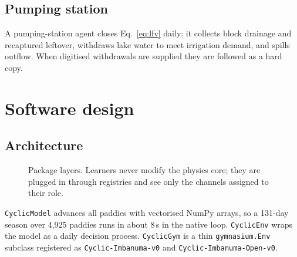 \documentclass[preprint,12pt,authoryear,review]{elsarticle}
\begin{document}
\subsection{Pumping station}

A pumping-station agent closes Eq.~\eqref{eq:lfv} daily: it collects block drainage and recaptured leftover, withdraws lake water to meet irrigation demand, and spills outflow. When digitised withdrawals are supplied they are followed as a hard copy.

\section{Software design}
\label{sec:software}

\subsection{Architecture}

\begin{figure}[htbp]
\centering
{}
\caption{Package layers. Learners never modify the physics core; they are plugged in through registries and see only the channels assigned to their role.}
\label{fig:arch}
\end{figure}

\texttt{CyclicModel} advances all paddies with vectorised NumPy arrays, so a 131-day season over 4,925 paddies runs in about 8\,s in the native loop. \texttt{CyclicEnv} wraps the model as a daily decision process. \texttt{CyclicGym} is a thin \texttt{gymnasium.Env} subclass registered as \texttt{Cyclic-Imbanuma-v0} and \texttt{Cyclic-Imbanuma-Open-v0}.
\end{document}
